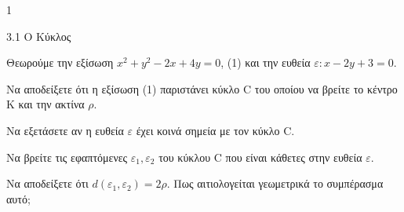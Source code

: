 \begin{ylh}{1}
    \item 3.1 Ο Κύκλος
\end{ylh}
Θεωρούμε την εξίσωση $x^2 + y^2 - 2x + 4y = 0$, (1) και την ευθεία $\varepsilon: x - 2y + 3 = 0$.
\begin{alist}
\item Να αποδείξετε ότι η εξίσωση (1) παριστάνει κύκλο C του οποίου να βρείτε το κέντρο Κ και την ακτίνα $\rho$. 
\item Να εξετάσετε αν η ευθεία $\varepsilon$ έχει κοινά σημεία με τον κύκλο C. 
\item Να βρείτε τις εφαπτόμενες $\varepsilon_1, \varepsilon_2$ του κύκλου C που είναι κάθετες στην ευθεία $\varepsilon$. 
\item Να αποδείξετε ότι $d(\varepsilon_1, \varepsilon_2)=2\rho$. Πως αιτιολογείται γεωμετρικά το συμπέρασμα αυτό; 
\end{alist}